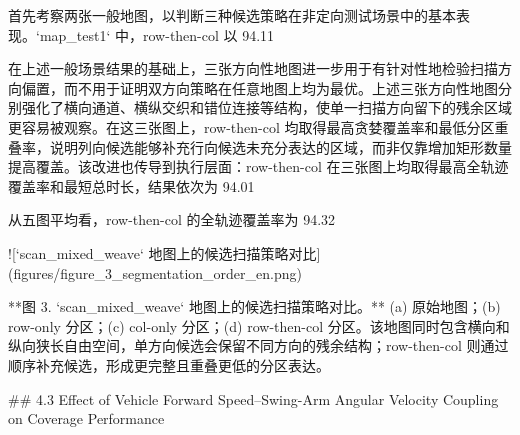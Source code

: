   

首先考察两张一般地图，以判断三种候选策略在非定向测试场景中的基本表现。`map_test1` 中，row-then-col 以 94.11%

在上述一般场景结果的基础上，三张方向性地图进一步用于有针对性地检验扫描方向偏置，而不用于证明双方向策略在任意地图上均为最优。上述三张方向性地图分别强化了横向通道、横纵交织和错位连接等结构，使单一扫描方向留下的残余区域更容易被观察。在这三张图上，row-then-col 均取得最高贪婪覆盖率和最低分区重叠率，说明列向候选能够补充行向候选未充分表达的区域，而非仅靠增加矩形数量提高覆盖。该改进也传导到执行层面：row-then-col 在三张图上均取得最高全轨迹覆盖率和最短总时长，结果依次为 94.01%

从五图平均看，row-then-col 的全轨迹覆盖率为 94.32%

![`scan_mixed_weave` 地图上的候选扫描策略对比](figures/figure_3_segmentation_order_en.png)

**图 3. `scan_mixed_weave` 地图上的候选扫描策略对比。** (a) 原始地图；(b) row-only 分区；(c) col-only 分区；(d) row-then-col 分区。该地图同时包含横向和纵向狭长自由空间，单方向候选会保留不同方向的残余结构；row-then-col 则通过顺序补充候选，形成更完整且重叠更低的分区表达。

  

## 4.3 Effect of Vehicle Forward Speed–Swing-Arm Angular Velocity Coupling on Coverage Performance

  


